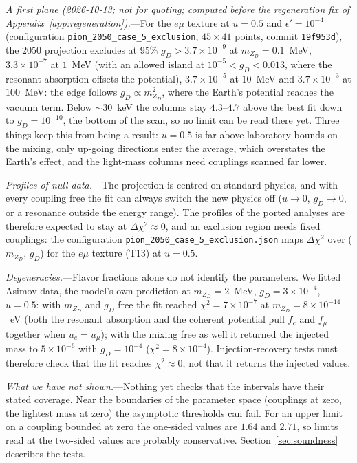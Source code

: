 \documentclass[11pt,a4paper]{article}
\newcommand{\file}[1]{\nolinkurl{#1}}
\newcommand{\mzd}{m_{Z_D}}
\newcommand{\gd}{g_D}
\newcommand{\epsp}{\epsilon'}
\begin{document}
\textit{A first plane (2026-10-13; not for quoting; computed before the regeneration fix of
Appendix~\ref{app:regeneration}).}---For the $e\mu$ texture at $u = 0.5$ and
$\epsp = 10^{-4}$ (configuration \texttt{pion\_2050\_case\_5\_exclusion}, $45\times41$ points,
commit \texttt{19f953d}), the 2050 projection excludes at 95\% $\gd > 3.7\times10^{-9}$ at
$\mzd = 0.1$~MeV, $3.3\times10^{-7}$ at $1$~MeV (with an allowed island at
$10^{-5} < \gd < 0.013$, where the resonant absorption offsets the potential), $3.7\times10^{-5}$
at $10$~MeV and $3.7\times10^{-3}$ at $100$~MeV: the edge follows $\gd\propto\mzd^2$, where the
Earth's potential reaches the vacuum term. Below $\sim30$~keV the columns stay $4.3$--$4.7$
above the best fit down to $\gd = 10^{-10}$, the bottom of the scan, so no limit can be read
there yet. Three things keep this from being a result: $u = 0.5$ is far above laboratory bounds
on the mixing, only up-going directions enter the average, which overstates the Earth's effect,
and the light-mass columns need couplings scanned far lower.

\textit{Profiles of null data.}---The projection is centred on standard physics, and with every
coupling free the fit can always switch the new physics off ($u\to0$, $\gd\to0$, or a resonance
outside the energy range). The profiles of the ported analyses are therefore expected to stay at
$\Delta\chi^2\approx0$, and an exclusion region needs fixed couplings: the configuration
\file{pion\_2050\_case\_5\_exclusion.json} maps $\Delta\chi^2$ over ($\mzd$, $\gd$) for the
$e\mu$ texture (T13) at $u = 0.5$.

\textit{Degeneracies.}---Flavor fractions alone do not identify the parameters. We fitted Asimov
data, the model's own prediction at $\mzd = 2$~MeV, $\gd = 3\times10^{-4}$, $u = 0.5$: with
$\mzd$ and $\gd$ free the fit reached $\chi^2 = 7\times10^{-7}$ at $\mzd = 8\times10^{-14}$~eV
(both the resonant absorption and the coherent potential pull $f_e$ and $f_\mu$ together when
$u_e = u_\mu$); with the mixing free as well it returned the injected mass to $5\times10^{-6}$
with $\gd = 10^{-4}$ ($\chi^2 = 8\times10^{-4}$). Injection-recovery tests must therefore check
that the fit reaches $\chi^2\approx0$, not that it returns the injected values.

\textit{What we have not shown.}---Nothing yet checks that the intervals have their stated
coverage. Near the boundaries of the parameter space (couplings at zero, the lightest mass at
zero) the asymptotic thresholds can fail. For an upper limit on a coupling bounded at zero the
one-sided values are $1.64$ and $2.71$, so limits read at the two-sided values are probably
conservative.
Section~\ref{sec:soundness} describes the tests.
\end{document}
